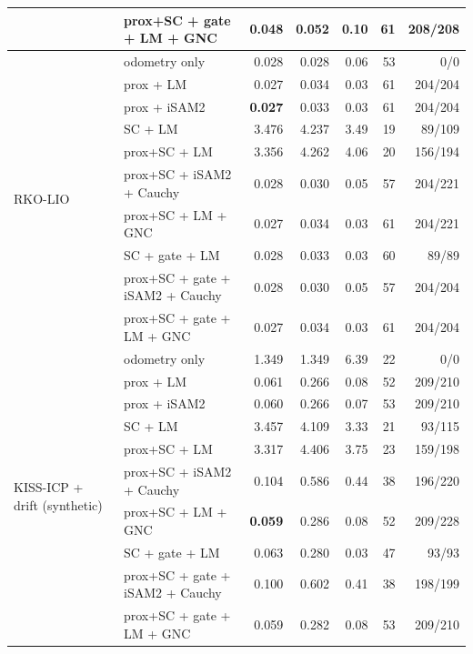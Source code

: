 \begin{table}[t]
\begin{tabular}{llrrrrr}
 & prox+SC + gate + LM + GNC & 0.048 & 0.052 & 0.10 & 61 & 208/208 \\
\midrule
\multirow{10}{*}{RKO-LIO} & odometry only & 0.028 & 0.028 & 0.06 & 53 & 0/0 \\
 & prox + LM & 0.027 & 0.034 & 0.03 & 61 & 204/204 \\
 & prox + iSAM2 & \textbf{0.027} & 0.033 & 0.03 & 61 & 204/204 \\
 & SC + LM & 3.476 & 4.237 & 3.49 & 19 & 89/109 \\
 & prox+SC + LM & 3.356 & 4.262 & 4.06 & 20 & 156/194 \\
 & prox+SC + iSAM2 + Cauchy & 0.028 & 0.030 & 0.05 & 57 & 204/221 \\
 & prox+SC + LM + GNC & 0.027 & 0.034 & 0.03 & 61 & 204/221 \\
 & SC + gate + LM & 0.028 & 0.033 & 0.03 & 60 & 89/89 \\
 & prox+SC + gate + iSAM2 + Cauchy & 0.028 & 0.030 & 0.05 & 57 & 204/204 \\
 & prox+SC + gate + LM + GNC & 0.027 & 0.034 & 0.03 & 61 & 204/204 \\
\midrule
\multirow{10}{*}{KISS-ICP + drift (synthetic)} & odometry only & 1.349 & 1.349 & 6.39 & 22 & 0/0 \\
 & prox + LM & 0.061 & 0.266 & 0.08 & 52 & 209/210 \\
 & prox + iSAM2 & 0.060 & 0.266 & 0.07 & 53 & 209/210 \\
 & SC + LM & 3.457 & 4.109 & 3.33 & 21 & 93/115 \\
 & prox+SC + LM & 3.317 & 4.406 & 3.75 & 23 & 159/198 \\
 & prox+SC + iSAM2 + Cauchy & 0.104 & 0.586 & 0.44 & 38 & 196/220 \\
 & prox+SC + LM + GNC & \textbf{0.059} & 0.286 & 0.08 & 52 & 209/228 \\
 & SC + gate + LM & 0.063 & 0.280 & 0.03 & 47 & 93/93 \\
 & prox+SC + gate + iSAM2 + Cauchy & 0.100 & 0.602 & 0.41 & 38 & 198/199 \\
 & prox+SC + gate + LM + GNC & 0.059 & 0.282 & 0.08 & 53 & 209/210 \\
\bottomrule
\end{tabular}
\end{table}

